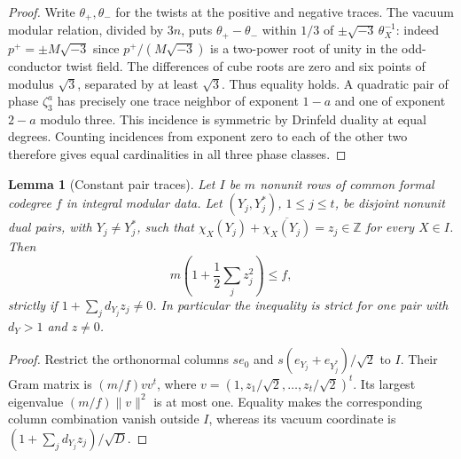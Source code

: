 \documentclass[11pt]{amsart}
\numberwithin{equation}{section}
\newtheorem{lemma}[theorem]{Lemma}
\theoremstyle{definition}
\theoremstyle{plain}
\begin{document}
\begin{proof}
Write $\theta_+,\theta_-$ for the twists at the positive and negative
traces. The vacuum modular relation, divided by $3n$, puts
$\theta_+-\theta_-$ within $1/3$ of $\pm\sqrt{-3}\,\theta_X^{-1}$:
indeed $p^+=\pm M\sqrt{-3}$ since $p^+/(M\sqrt{-3})$ is a
two-power root of unity in the odd-conductor twist field.
The differences of cube roots are zero and six points of modulus
$\sqrt3$, separated by at least $\sqrt3$. Thus equality holds.
A quadratic pair of phase $\zeta_3^a$ has precisely one trace neighbor
of exponent $1-a$ and one of exponent $2-a$ modulo three.
This incidence is symmetric by Drinfeld duality at equal degrees.
Counting incidences from exponent zero to each of the other two
therefore gives equal cardinalities in all three phase classes.
\end{proof}

\begin{lemma}[Constant pair traces]\label{odd:constant-pair-trace}
Let $I$ be $m$ nonunit rows of common formal codegree $f$ in integral
modular data. Let $(Y_j,Y_j^*)$, $1\le j\le t$, be disjoint nonunit
dual pairs, with $Y_j\ne Y_j^*$, such that
$\chi_X(Y_j)+\overline{\chi_X(Y_j)}=z_j\in\mathbb Z$
for every $X\in I$. Then
\[
             m\left(1+\frac12\sum_jz_j^2\right)\le f,
\]
strictly if $1+\sum_jd_{Y_j}z_j\ne0$. In particular the inequality
is strict for one pair with $d_Y>1$ and $z\ne0$.
\end{lemma}
\begin{proof}
Restrict the orthonormal columns $se_0$ and
$s(e_{Y_j}+e_{Y_j^*})/\sqrt2$ to $I$. Their Gram matrix is
$(m/f)vv^t$, where $v=(1,z_1/\sqrt2,\ldots,z_t/\sqrt2)^t$.
Its largest eigenvalue $(m/f)\|v\|^2$ is at most one.
Equality makes the corresponding column combination vanish outside
$I$, whereas its vacuum coordinate is
$(1+\sum_jd_{Y_j}z_j)/\sqrt D$.
\end{proof}
\end{document}
